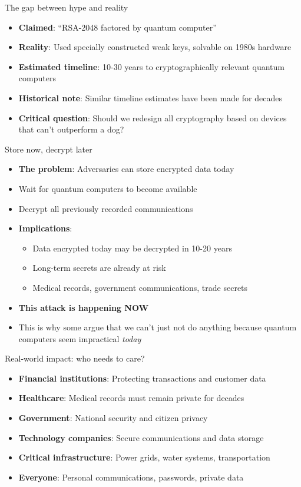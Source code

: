 \documentclass[aspectratio=169, lualatex]{beamer} %
\begin{document}
\begin{frame}{The gap between hype and reality}
	\begin{itemize}
		\item \textbf{Claimed}: ``RSA-2048 factored by quantum computer''
		\item \textbf{Reality}: Used specially constructed weak keys, solvable on 1980s hardware
		\item \textbf{Estimated timeline}: 10-30 years to cryptographically relevant quantum computers
		\item \textbf{Historical note}: Similar timeline estimates have been made for decades
		\item \textbf{Critical question}: Should we redesign all cryptography based on devices that can't outperform a dog?
	\end{itemize}
\end{frame}

\fi

\begin{frame}{Store now, decrypt later}
	\begin{itemize}
		\item \textbf{The problem}: Adversaries can store encrypted data today
		\item Wait for quantum computers to become available
		\item Decrypt all previously recorded communications
		\item \textbf{Implications}:
		      \begin{itemize}
			      \item Data encrypted today may be decrypted in 10-20 years
			      \item Long-term secrets are already at risk
			      \item Medical records, government communications, trade secrets
		      \end{itemize}
		\item \textbf{This attack is happening NOW}
		\item This is why some argue that we can't just not do anything because quantum computers seem impractical \textit{today}
	\end{itemize}
\end{frame}

\begin{frame}{Real-world impact: who needs to care?}
	\begin{itemize}
		\item \textbf{Financial institutions}: Protecting transactions and customer data
		\item \textbf{Healthcare}: Medical records must remain private for decades
		\item \textbf{Government}: National security and citizen privacy
		\item \textbf{Technology companies}: Secure communications and data storage
		\item \textbf{Critical infrastructure}: Power grids, water systems, transportation
		\item \textbf{Everyone}: Personal communications, passwords, private data
	\end{itemize}
\end{frame}
\end{document}
